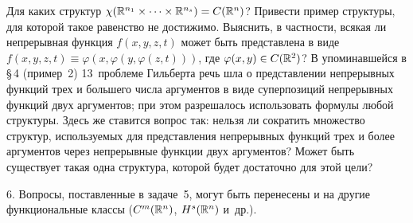 Для каких структур $\chi(\mathbb R^{n_1}\times\dots\times\mathbb R^{n_s})=C(\mathbb R^n)$?
Привести пример структуры, для которой такое равенство не достижимо.
Выяснить, в частности, всякая ли непрерывная функция $f(x,y,z,t)$ может быть
представлена в виде $f(x,y,z,t)\equiv\varphi(x,\varphi(y,\varphi(z,t)))$,
где $\varphi(x,y)\in C(\mathbb R^2)$? В упоминавшейся в \S\,4 (пример~2)
13~проблеме Гильберта речь шла о представлении непрерывных функций трех и
большего числа аргументов в виде суперпозиций непрерывных функций двух
аргументов; при этом разрешалось использовать формулы любой структуры.
Здесь же ставится вопрос так: нельзя ли сократить множество структур,
используемых для представления непрерывных функций трех и более аргументов
через непрерывные функции двух аргументов? Может быть существует такая
одна структура, которой будет достаточно для этой цели?

6. Вопросы, поставленные в задаче~5, могут быть перенесены и на другие
функциональные классы ($C^m(\mathbb R^n)$, $H^s(\mathbb R^n)$ и~др.).
